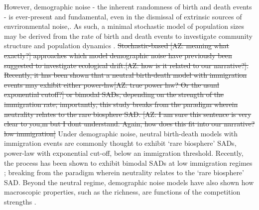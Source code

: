 \documentclass[9pt,twocolumn,twoside,lineno]{pnas-new}
\begin{document}
However, demographic noise - the inherent randomness of birth and death events - is ever-present and fundamental, even in the dismissal of extrinsic sources of envrironmental noise,. %
As such, a minimal stochastic model of population sizes may be derived from the rate of birth and death events to investigate community structure and population dynamics \cite{hubbell2001unified,alonso2006merits,haegeman2011mathematical}. 
%
\st{ Stochastic-based [AZ: meaning what exactly?] approaches which model demographic noise have previously been suggested to investigate ecological drift.[AZ: how is it related to our narrative?]. Recently, it has been shown that a neutral birth-death model with immigration events may exhibit either power-law[AZ: true power law? Or the usual exponential cutoff?] or bimodal SADs, depending on the strength of the immigration rate; importantly, this study breaks from the paradigm wherein neutrality relates to the rare biosphere SAD. [AZ: I am sure this sentence is very clear to you,m but I dont understand. Again, how does this fit into our narrative? low immigration]} %
Under demographic noise, neutral birth-death models with immigration events are commonly thought to exhibit `rare biosphere' SADs, power-law with exponential cut-off, below an immigration threshold. 
Recently, the process has been shown to exhibit bimodal SADs at low immigration regimes \cite{xu2018immigration}; breaking from the paradigm wherein neutrality relates to the `rare biosphere' SAD.
Beyond the neutral regime, demographic noise models have also shown how macroscopic properties, such as the richness, are functions of the competition strengths \cite{haegeman2011mathematical,capitan2015similar,capitan2017stochastic,capitan2020competitive}. %
\end{document}
